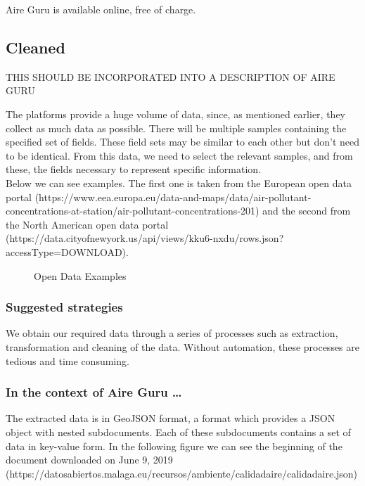 Aire Guru is available online, free of charge.

\subsection*{Cleaned}

THIS SHOULD BE INCORPORATED INTO A DESCRIPTION OF AIRE GURU

The platforms provide a huge volume of data, since, as mentioned earlier, they collect as much data as possible.
There will be multiple samples containing the specified set of fields. These field sets may be similar to each other but don't need to be identical.
From this data, we need to select the relevant samples, and from these, the fields necessary to represent specific information.\\

Below we can see examples. The first one is taken from the European open data portal
(https://www.eea.europa.eu/data-and-maps/data/air-pollutant-concentrations-at-station/air-pollutant-concentrations-201) and the second from the North American open data portal
(https://data.cityofnewyork.us/api/views/kku6-nxdu/rows.json?accessType=DOWNLOAD).
\newpage
\begin{figure}[ht]
    \centering
    \hfill
    \caption{Open Data Examples}
\end{figure}
    
\subsubsection*{Suggested strategies}

We obtain our required data through a series of processes such as extraction, transformation and
cleaning of the data. Without automation, these processes are tedious and time consuming. 

\subsubsection*{In the context of Aire Guru \ldots} 

The extracted data is in GeoJSON format, a format which provides a JSON object with nested subdocuments. Each of these
subdocuments contains a set of data in key-value form.
In the following figure we can see the beginning of the document downloaded on June 9, 2019
(https://datosabiertos.malaga.eu/recursos/ambiente/calidadaire/calidadaire.json) \\

